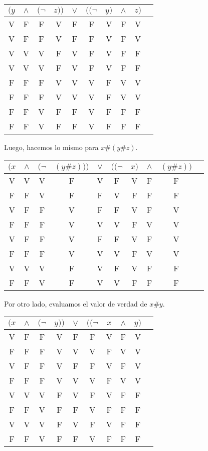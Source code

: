 \documentclass[osajnl,twocolumn,showpacs,superscriptaddress,10pt]{revtex4-1} %
\begin{document}
\begin{table}[h!]
  \setlength{\tabcolsep}{1.0em}
  \centering
  \begin{tabular}{cccc|c|ccccc}
    $(y$ & $\wedge$ & $(\neg$ & $z))$ & $\vee$ & $((\neg$ & $y)$ & $\wedge$ & $z)$\\
    \hline
    V & F & F & V & F & F & V & F & V\\
    V & F & F & V & F & F & V & F & V\\
    V & V & V & F & V & F & V & F & F\\
    V & V & V & F & V & F & V & F & F\\
    F & F & F & V & V & V & F & V & V\\
    F & F & F & V & V & V & F & V & V\\
    F & F & V & F & F & V & F & F & F\\
    F & F & V & F & F & V & F & F & F
  \end{tabular}
\end{table}

Luego, hacemos lo mismo para $x\#(y\#z)$.

\begin{table}[h!]
  \setlength{\tabcolsep}{1.0em}
  \centering
  \begin{tabular}{cccc|c|ccccc}
    $(x$ & $\wedge$ & $(\neg$ & $(y\#z)))$ & $\vee$ & $((\neg$ & $x)$ & $\wedge$ & $(y\#z))$\\
    \hline
    V & V & V & F & V & F & V & F & F\\
    F & F & V & F & F & V & F & F & F\\
    V & F & F & V & F & F & V & F & V\\
    F & F & F & V & V & V & F & V & V\\
    V & F & F & V & F & F & V & F & V\\
    F & F & F & V & V & V & F & V & V\\
    V & V & V & F & V & F & V & F & F\\
    F & F & V & F & V & V & F & F & F
  \end{tabular}
\end{table}

Por otro lado, evaluamos el valor de verdad de $x\#y$.

\begin{table}[h!]
  \setlength{\tabcolsep}{1.0em}
  \centering
  \begin{tabular}{cccc|c|ccccc}
    $(x$ & $\wedge$ & $(\neg$ & $y))$ & $\vee$ & $((\neg$ & $x$ & $\wedge$ & $y)$\\
    \hline
    V & F & F & V & F & F & V & F & V\\
    F & F & F & V & V & V & F & V & V\\
    V & F & F & V & F & F & V & F & V\\
    F & F & F & V & V & V & F & V & V\\
    V & V & V & F & V & F & V & F & F\\
    F & F & V & F & F & V & F & F & F\\
    V & V & V & F & V & F & V & F & F\\
    F & F & V & F & F & V & F & F & F
  \end{tabular}
\end{table}
\end{document}
